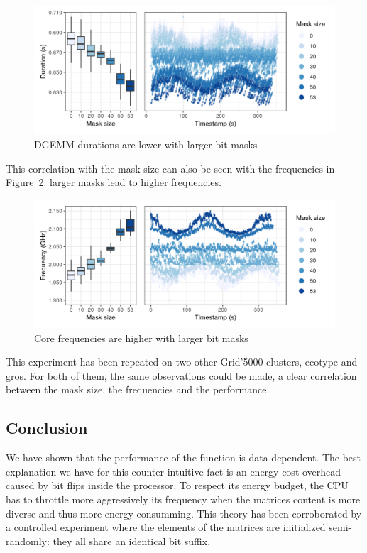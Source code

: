             \begin{figure}[htbp]
                \centering
                \includegraphics[width=\textwidth]{img/experiment/bit-flips/mask_size_perf.png}
                \caption{\label{fig:exp:bit-flips:mask-perf}
                DGEMM durations are lower with larger bit masks}
            \end{figure}

            This correlation with the mask size can also be seen with the frequencies in
            Figure~\ref{fig:exp:bit-flips:mask-freq}: larger masks lead to higher frequencies.

            \begin{figure}[htbp]
                \centering
                \includegraphics[width=\textwidth]{img/experiment/bit-flips/mask_size_freq.png}
                \caption{\label{fig:exp:bit-flips:mask-freq}
                Core frequencies are higher with larger bit masks}
            \end{figure}

            This experiment has been repeated on two other Grid'5000 clusters, ecotype and gros. For both of them, the
            same observations could be made, a clear correlation between the mask size, the frequencies and the
            performance.

        \subsection{Conclusion}
            We have shown that the performance of the \dgemm function is data-dependent. The best explanation we
            have for this counter-intuitive fact is an energy cost overhead caused by bit flips inside the processor.
            To respect its energy budget, the CPU has to throttle more aggressively its frequency when the matrices
            content is more diverse and thus more energy consumming.
            This theory has been corroborated by a controlled experiment where the elements of the matrices are
            initialized semi-randomly: they all share an identical bit suffix.


